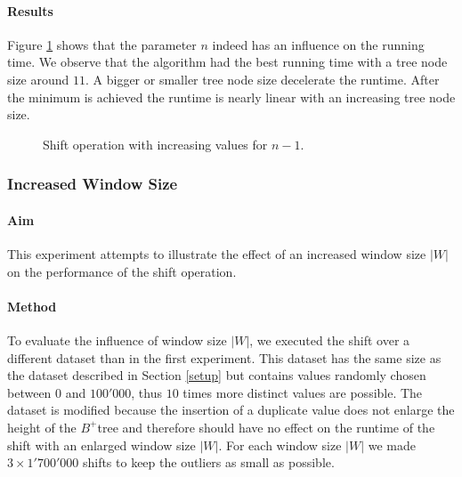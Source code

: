 \documentclass[abstracton,12pt,oneside]{scrreprt}
\begin{document}
\paragraph{Results}
Figure \ref{tab:1} shows that the parameter $n$ indeed has an influence on the running time. We observe that the algorithm had the best running time with a tree node size around $11$. A bigger or smaller tree node size decelerate the runtime. After the minimum is achieved the runtime is nearly linear with an increasing tree node size.



\begin{figure}[H]
	\centering
	\caption{Shift operation with increasing values for $n-1$.} \label{tab:1}
\end{figure}

\subsubsection{Increased Window Size}

\paragraph{Aim}

This experiment attempts to illustrate the effect of an increased window size $|W|$ on the performance of the shift operation. 

\paragraph{Method}
To evaluate the influence of window size $|W|$, we executed the shift over a different dataset than in the first experiment. This dataset has the same size as the dataset described in Section \ref{setup} but contains values randomly chosen between $0$ and $100'000$, thus $10$ times more distinct values are possible. The dataset is modified because the insertion of a duplicate value does not enlarge the height of the $B^+$tree and therefore should have no effect on the runtime of the shift with an enlarged window size $|W|$. For each window size $|W|$ we made $3 \times 1'700'000$ shifts to keep the outliers as small as possible. 
\end{document}
